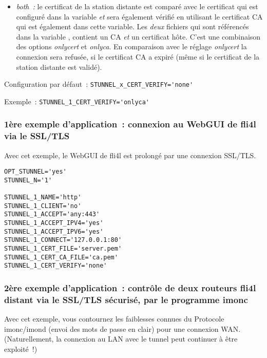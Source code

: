 \begin{description}
\begin{itemize}
\item \emph{both~:} le certificat de la station distante est comparé avec le certificat
qui est configuré dans la variable  \emph{et} sera également
vérifié en utilisant le certificat CA qui est également dans cette variable. Les \emph{deux}
fichiers qui sont référencés dans la variable , contient un CA
\emph{et} un certificat hôte. C'est une combinaison des options \emph{onlycert} et \emph{onlyca}.
En comparaison avec le réglage \emph{onlycert} la connexion sera refusée, si le certificat CA
a expiré (même si le certificat de la station distante est validé).

\end{itemize}

Configuration par défaut~: \verb+STUNNEL_x_CERT_VERIFY='none'+

Exemple~: \verb+STUNNEL_1_CERT_VERIFY='onlyca'+

\end{description}

\subsubsection{1ère exemple d'application~: connexion au WebGUI de fli4l via le SSL/TLS}

Avec cet exemple, le WebGUI de fli4l est prolongé par une connexion SSL/TLS.

\begin{example}
\begin{verbatim}
OPT_STUNNEL='yes'
STUNNEL_N='1'

STUNNEL_1_NAME='http'
STUNNEL_1_CLIENT='no'
STUNNEL_1_ACCEPT='any:443'
STUNNEL_1_ACCEPT_IPV4='yes'
STUNNEL_1_ACCEPT_IPV6='yes'
STUNNEL_1_CONNECT='127.0.0.1:80'
STUNNEL_1_CERT_FILE='server.pem'
STUNNEL_1_CERT_CA_FILE='ca.pem'
STUNNEL_1_CERT_VERIFY='none'
\end{verbatim}
\end{example}

\subsubsection{2ère exemple d'application~: contrôle de deux routeurs fli4l distant via
le SSL/TLS sécurisé, par le programme imonc}

Avec cet exemple, vous contournez les faiblesses connues du Protocole imonc/imond (envoi
des mots de passe en clair) pour une connexion WAN. (Naturellement, la connexion au LAN
avec le tunnel peut continuer à être exploité~!)

